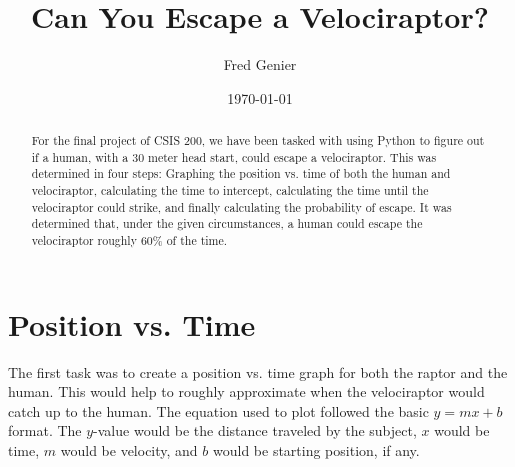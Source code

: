 \documentclass[twocolumn]{revtex4}
\begin{document}
\title{
Can You Escape a Velociraptor?
}

\author{Fred Genier}

\date{\today}

\begin{abstract}
    For the final project of CSIS 200, we have been tasked with using Python to figure out if a human, with a 30 meter head start, could escape a velociraptor. This was determined in four steps: Graphing the position vs. time of both the human and velociraptor, calculating the time to intercept, calculating the time until the velociraptor could strike, and finally calculating the probability of escape. It was determined that, under the given circumstances, a human could escape the velociraptor roughly 60\% of the time.
\end{abstract}

\maketitle

\section{Position vs. Time}

	The first task was to create a position vs. time graph for both the raptor and the human. This would help to roughly approximate when the velociraptor would catch up to the human. The equation used to plot followed the basic $y=mx+b$ format. The $y$-value would be the distance traveled by the subject, $x$ would be time, $m$ would be velocity, and $b$ would be starting position, if any.
	
\end{document}
